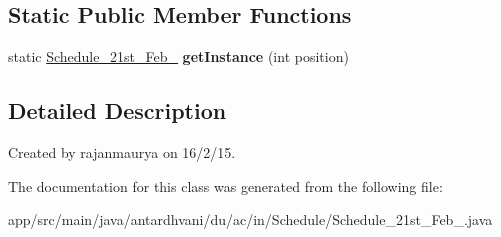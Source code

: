 \subsection*{Static Public Member Functions}
\begin{DoxyCompactItemize}
\item 
\hypertarget{classantardhvani_1_1du_1_1ac_1_1in_1_1_schedule_1_1_schedule__21st___feb__2015_a7f4bca24cd11368000b12337e4220850}{}static \hyperlink{classantardhvani_1_1du_1_1ac_1_1in_1_1_schedule_1_1_schedule__21st___feb__2015}{Schedule\+\_\+21st\+\_\+\+Feb\+\_} {\bfseries get\+Instance} (int position)\label{classantardhvani_1_1du_1_1ac_1_1in_1_1_schedule_1_1_schedule__21st___feb__2015_a7f4bca24cd11368000b12337e4220850}

\end{DoxyCompactItemize}


\subsection{Detailed Description}
Created by rajanmaurya on 16/2/15. 

The documentation for this class was generated from the following file\+:\begin{DoxyCompactItemize}
\item 
app/src/main/java/antardhvani/du/ac/in/\+Schedule/Schedule\+\_\+21st\+\_\+\+Feb\+\_.\+java\end{DoxyCompactItemize}
